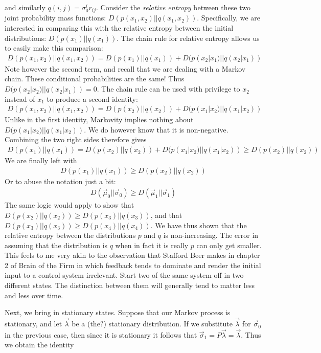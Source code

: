 \documentclass{article}
\theoremstyle{definition}
\theoremstyle{plain}
\begin{document}
and similarly $q(i,j) = \sigma_0^ir_{ij}$. Consider the \emph{relative entropy} between these two joint probability mass functions: $D(p(x_1,x_2)||q(x_1,x_2))$. Specifically, we are interested in comparing this with the relative entropy between the initial distributions: $D(p(x_1)||q(x_1))$. The chain rule for relative entropy allows us to easily make this comparison:
\begin{align}
	D(p(x_1,x_2)||q(x_1,x_2)) = D(p(x_1)||q(x_1)) + D(p(x_2|x_1)||q(x_2|x_1))	
\end{align}
Note however the second term, and recall that we are dealing with a Markov chain. These conditional probabilities are the same! Thus $D(p(x_2|x_2)||q(x_2|x_1)) = 0$. The chain rule can be used with privilege to $x_2$ instead of $x_1$ to produce a second identity:
\begin{align}
	D(p(x_1,x_2)||q(x_1,x_2)) = D(p(x_2)||q(x_2)) + D(p(x_1|x_2)||q(x_1|x_2))	
\end{align}
Unlike in the first identity, Markovity implies nothing about $D(p(x_1|x_2)||q(x_1|x_2))$. We do however know that it is non-negative. Combining the two right sides therefore gives  
\begin{align}
	D(p(x_1)||q(x_1)) = D(p(x_2)||q(x_2))+D(p(x_1|x_2)||q(x_1|x_2)) \geq D(p(x_2)||q(x_2))
\end{align}
We are finally left with 
\begin{align}
	D(p(x_1)||q(x_1)) \geq D(p(x_2)||q(x_2))
\end{align}
Or to abuse the notation just a bit:
\begin{align}
	D(\vec{\mu}_0||\vec{\sigma}_0) \geq D(\vec{\mu}_1||\vec{\sigma}_1)
\end{align}
The same logic would apply to show that $D(p(x_2)||q(x_2)) \geq D(p(x_3)||q(x_3))$, and that $D(p(x_3)||q(x_3)) \geq D(p(x_4)||q(x_4))$. We have thus shown that the relative entropy between the distributions $p$ and $q$ is non-increasing. The error in assuming that the distribution is $q$ when in fact it is really $p$ can only get smaller. This feels to me very akin to the observation that Stafford Beer makes in chapter 2 of Brain of the Firm in which feedback tends to dominate and render the initial input to a control system irrelevant. Start two of the same system off in two different states. The distinction between them will generally tend to matter less and less over time. \par 
Next, we bring in stationary states. Suppose that our Markov process is stationary, and let $\vec{\lambda}$ be a (the?) stationary distribution. If we substitute $\vec{\lambda}$ for $\vec{\sigma}_0$ in the previous case, then since it is stationary it follows that $\vec{\sigma}_1 = P\vec{\lambda} = \vec{\lambda}$. Thus we obtain the identity
\end{document}
